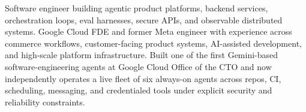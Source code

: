 


Software engineer building agentic product platforms, backend services, orchestration loops, eval harnesses, secure APIs, and observable distributed systems. Google Cloud FDE and former Meta engineer with experience across commerce workflows, customer-facing product systems, AI-assisted development, and high-scale platform infrastructure. Built one of the first Gemini-based software-engineering agents at Google Cloud Office of the CTO and now independently operates a live fleet of six always-on agents across repos, CI, scheduling, messaging, and credentialed tools under explicit security and reliability constraints.








